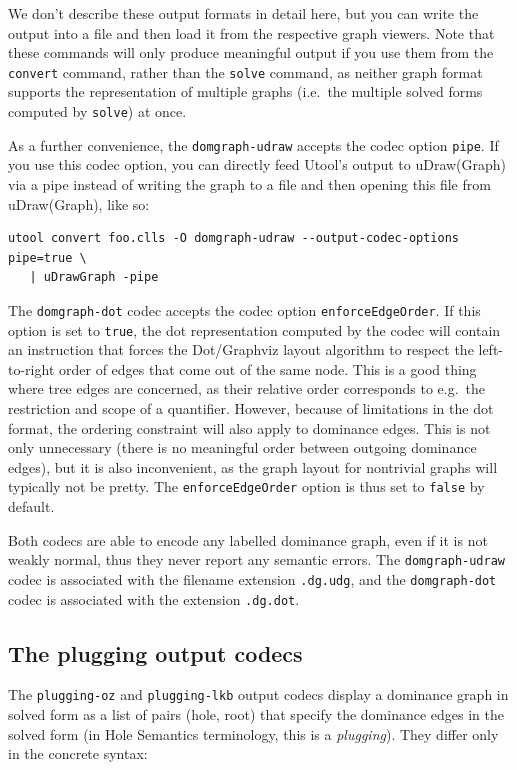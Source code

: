 We don't describe these output formats in detail here, but you can
write the output into a file and then load it from the respective
graph viewers. Note that these commands will only produce meaningful
output if you use them from the \verb|convert| command, rather than
the \verb|solve| command, as neither graph format supports the
representation of multiple graphs (i.e.\ the multiple solved forms
computed by \verb|solve|) at once.

As a further convenience, the \verb|domgraph-udraw| accepts the codec
option \verb|pipe|. If you use this codec option, you can directly
feed Utool's output to uDraw(Graph) via a pipe instead of writing the
graph to a file and then opening this file from uDraw(Graph), like so:

\begin{verbatim}
utool convert foo.clls -O domgraph-udraw --output-codec-options pipe=true \
   | uDrawGraph -pipe
\end{verbatim}

The \verb|domgraph-dot| codec accepts the codec option \verb|enforceEdgeOrder|. If this option is set to \verb|true|, the dot representation computed by the codec will contain an instruction that forces the Dot/Graphviz layout algorithm to respect the left-to-right order of edges that come out of the same node. This is a good thing where tree edges are concerned, as their relative order corresponds to e.g.\ the restriction and scope of a quantifier. However, because of limitations in the dot format, the ordering constraint will also apply to dominance edges. This is not only unnecessary (there is no meaningful order between outgoing dominance edges), but it is also inconvenient, as the graph layout for nontrivial graphs will typically not be pretty. The \verb|enforceEdgeOrder| option is thus set to \verb|false| by default.

Both codecs are able to encode any labelled dominance graph, even if
it is not weakly normal, thus they never report any semantic
errors. The \verb|domgraph-udraw| codec is associated with the
filename extension \verb|.dg.udg|, and the \verb|domgraph-dot| codec
is associated with the extension \verb|.dg.dot|.



\subsection{The plugging output codecs}

The \verb?plugging-oz? and \verb?plugging-lkb? output codecs display a
dominance graph in solved form as a list of pairs (hole, root) that
specify the dominance edges in the solved form (in Hole Semantics
terminology, this is a \emph{plugging}). They differ only in the
concrete syntax:

